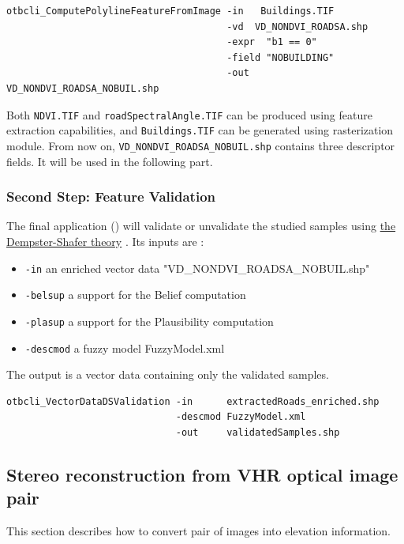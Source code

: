 \begin{verbatim}
otbcli_ComputePolylineFeatureFromImage -in   Buildings.TIF
                                       -vd  VD_NONDVI_ROADSA.shp
                                       -expr  "b1 == 0"
                                       -field "NOBUILDING"
                                       -out   VD_NONDVI_ROADSA_NOBUIL.shp
\end{verbatim}

Both \verb?NDVI.TIF? and \verb?roadSpectralAngle.TIF? can be produced
using \mont feature extraction capabilities, and \verb?Buildings.TIF?
can be generated using \mont rasterization module. From now on,
\verb?VD_NONDVI_ROADSA_NOBUIL.shp? contains three descriptor fields.
It will be used in the following part.

\subsubsection{Second Step: Feature Validation}

The final application () will
validate or unvalidate the studied samples using
\href{http://en.wikipedia.org/wiki/Dempster\%E2\%80\%93Shafer_theory}{the Dempster-Shafer theory}
. Its inputs are :
\begin{itemize}
\item \verb?-in? an enriched vector data "VD\_NONDVI\_ROADSA\_NOBUIL.shp"
\item \verb?-belsup? a support for the Belief computation
\item \verb?-plasup? a support for the Plausibility computation
\item \verb?-descmod? a fuzzy model FuzzyModel.xml
\end{itemize}
The output is a vector data containing only the validated samples.

\begin{verbatim}
otbcli_VectorDataDSValidation -in      extractedRoads_enriched.shp
                              -descmod FuzzyModel.xml
                              -out     validatedSamples.shp
\end{verbatim}

\subsection{Stereo reconstruction from VHR optical image pair}\label{ssec:stereoreconstruction}

This section describes how to convert pair of images into elevation information.

